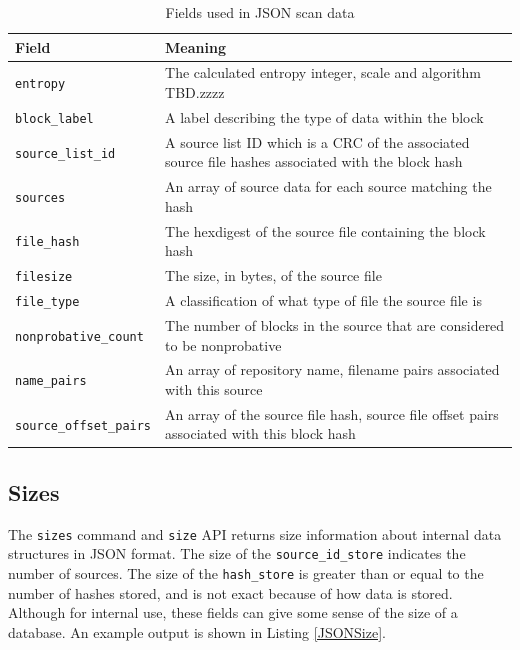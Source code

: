 \documentclass[11pt,fleqn]{article} %
\begin{document}
\begin{table}[!ht]

\centering
\caption{Fields used in JSON scan data}
\label{tab:JSONScanData}
\begin{tabular}{|p{5 cm}|p{8.8 cm}|}
\hline \hline
\textbf{Field} & \textbf{Meaning} \\
\hline
\verb+entropy+ & The calculated entropy integer, scale and algorithm TBD.zzzz\\
\hline
\verb+block_label+ & A label describing the type of data within the block\\
\hline
\verb+source_list_id+ & A source list ID which is a CRC of the associated source file hashes associated with the block hash\\
\hline
\verb+sources+ & An array of source data for each source matching the hash\\
\hline
\verb+file_hash+ & The hexdigest of the source file containing the block hash\\
\hline
\verb+filesize+ & The size, in bytes, of the source file\\
\hline
\verb+file_type+ & A classification of what type of file the source file is\\
\hline
\verb+nonprobative_count+ & The number of blocks in the source that are considered to be nonprobative\\
\hline
\verb+name_pairs+ & An array of repository name, filename pairs associated with this source\\
\hline
\verb+source_offset_pairs+ & An array of the source file hash, source file offset pairs associated with this block hash\\
\hline
\end{tabular}
\end{table}

\subsection{Sizes}
The \hdb \verb+sizes+ command and \verb+size+ API returns size information about internal data structures in JSON format. The size of the \verb+source_id_store+ indicates the number of sources. The size of the \verb+hash_store+ is greater than or equal to the number of hashes stored, and is not exact because of how data is stored. Although for internal use, these fields can give some sense of the size of a \hdb database. An example output is shown in Listing \ref{JSONSize}.\\
\end{document}
